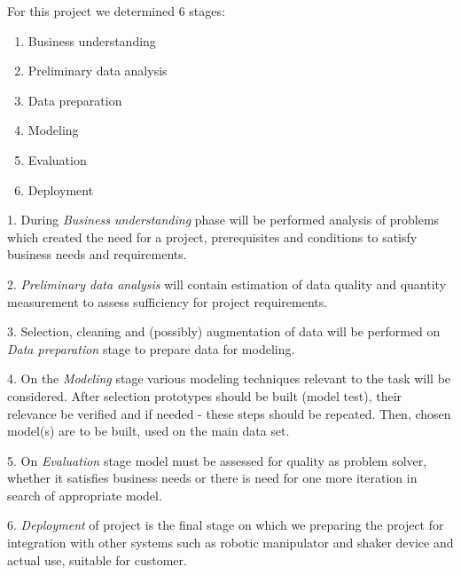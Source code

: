 
For this project we determined 6 stages:
\begin{enumerate}
    \item Business understanding
    \item Preliminary data analysis
    \item Data preparation
    \item Modeling
    \item Evaluation
    \item Deployment
\end{enumerate}

\bigskip

1. During \textit{Business understanding} phase will be performed analysis of problems which created the need for a project, prerequisites and conditions to satisfy business needs and requirements.

\bigskip

2. \textit{Preliminary data analysis} will contain estimation of data quality and quantity measurement to assess sufficiency for project requirements.

\bigskip

3. Selection, cleaning and (possibly) augmentation of data will be performed on \textit{Data preparation} stage to prepare data for modeling.

\bigskip

4. On the \textit{Modeling} stage various modeling techniques relevant to the task will be considered. After selection prototypes should be built (model test), their relevance be verified and if needed - these steps should be repeated. Then, chosen model(s) are to be built, used on the main data set.

\bigskip

5.  On \textit{Evaluation} stage model must be assessed for quality as problem solver, whether it satisfies business needs or there is need for one more iteration in search of appropriate model.

\bigskip

6. \textit{Deployment} of project is the final stage on which we preparing the project for integration with other systems such as robotic manipulator and shaker device and actual use, suitable for customer.



